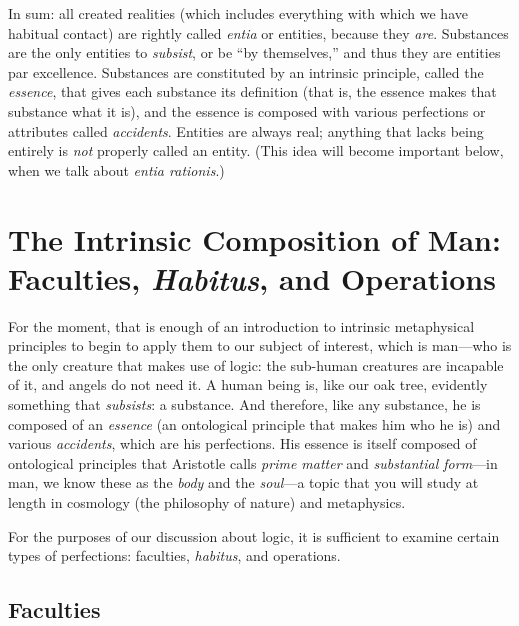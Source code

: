 \documentclass[
  12pt,
]{memoir}
\begin{document}
In sum: all created realities (which includes everything with which we
have habitual contact) are rightly called \emph{entia} or entities,
because they \emph{are}. Substances are the only entities to
\emph{subsist}, or be ``by themselves,'' and thus they are entities par
excellence. Substances are constituted by an intrinsic principle, called
the \emph{essence}, that gives each substance its definition (that is,
the essence makes that substance what it is), and the essence is
composed with various perfections or attributes called \emph{accidents}.
Entities are always real; anything that lacks being entirely is
\emph{not} properly called an entity. (This idea will become important
below, when we talk about \emph{entia rationis}.)

\section{\texorpdfstring{The Intrinsic Composition of Man: Faculties,
\emph{Habitus}, and
Operations}{The Intrinsic Composition of Man: Faculties, Habitus, and Operations}}\label{the-intrinsic-composition-of-man-faculties-habitus-and-operations}

For the moment, that is enough of an introduction to intrinsic
metaphysical principles to begin to apply them to our subject of
interest, which is man---who is the only creature that makes use of
logic: the sub-human creatures are incapable of it, and angels do not
need it. A human being is, like our oak tree, evidently something that
\emph{subsists}: a substance. And therefore, like any substance, he is
composed of an \emph{essence} (an ontological principle that makes him
who he is) and various \emph{accidents}, which are his perfections. His
essence is itself composed of ontological principles that Aristotle
calls \emph{prime matter} and \emph{substantial form}---in man, we know
these as the \emph{body} and the \emph{soul}---a topic that you will
study at length in cosmology (the philosophy of nature) and metaphysics.

For the purposes of our discussion about logic, it is sufficient to
examine certain types of perfections: faculties, \emph{habitus}, and
operations.

\subsection{Faculties}\label{faculties}
\end{document}
